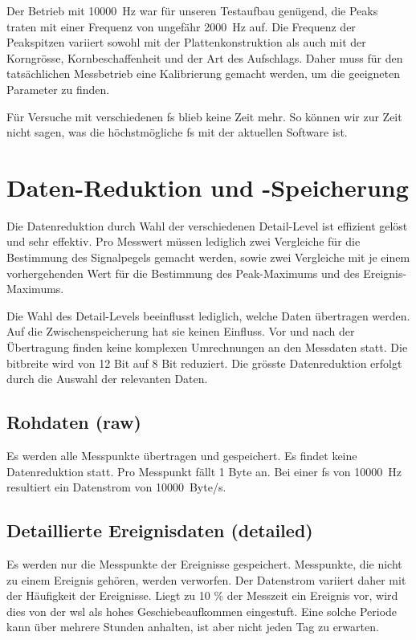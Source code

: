 Der Betrieb mit 10000~Hz war für unseren Testaufbau genügend, die Peaks traten mit einer Frequenz von ungefähr 2000~Hz auf. Die Frequenz der Peakspitzen variiert sowohl mit der Plattenkonstruktion als auch mit der Korngrösse, Kornbeschaffenheit und der Art des Aufschlags. Daher muss für den tatsächlichen Messbetrieb eine Kalibrierung gemacht werden, um die geeigneten Parameter zu finden.

Für Versuche mit verschiedenen \gls{fs} blieb keine Zeit mehr. So können wir zur Zeit nicht sagen, was die höchstmögliche \gls{fs} mit der aktuellen Software ist.

\section{Daten-Reduktion und -Speicherung}
Die Datenreduktion durch Wahl der verschiedenen Detail-Level ist effizient gelöst und sehr effektiv. Pro Messwert müssen lediglich zwei Vergleiche für die Bestimmung des Signalpegels gemacht werden, sowie zwei Vergleiche mit je einem vorhergehenden Wert für die Bestimmung des Peak-Maximums und des Ereignis-Maximums.

Die Wahl des Detail-Levels beeinflusst lediglich, welche Daten übertragen werden. Auf die Zwischenspeicherung hat sie keinen Einfluss. Vor und nach der Übertragung finden keine komplexen Umrechnungen an den Messdaten statt. Die \gls{bitbreite} wird von 12 Bit auf 8 Bit reduziert. Die grösste Datenreduktion erfolgt durch die Auswahl der relevanten Daten.

\subsection{Rohdaten (raw)}
Es werden alle Messpunkte übertragen und gespeichert. Es findet keine Datenreduktion statt. Pro Messpunkt fällt 1 Byte an. Bei einer \gls{fs} von 10000~Hz resultiert ein Datenstrom von 10000~Byte/s.

\subsection{Detaillierte Ereignisdaten (detailed)}
Es werden nur die Messpunkte der Ereignisse gespeichert. Messpunkte, die nicht zu einem Ereignis gehören, werden verworfen. Der Datenstrom variiert daher mit der Häufigkeit der Ereignisse. Liegt zu 10 \% der Messzeit ein Ereignis vor, wird dies von der \gls{wsl} als hohes Geschiebeaufkommen eingestuft. Eine solche Periode kann über mehrere Stunden anhalten, ist aber nicht jeden Tag zu erwarten.

